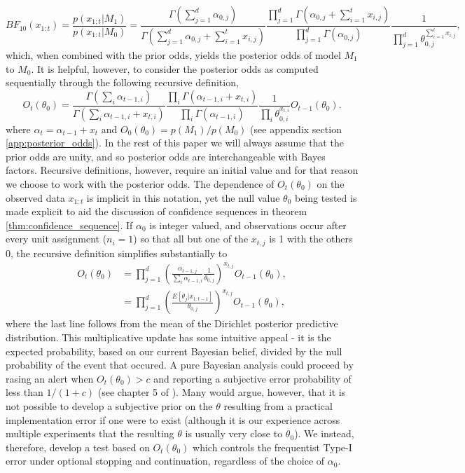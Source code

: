 \documentclass[11pt]{article}
\begin{document}
\begin{equation}
  \label{eq:bayes_factor}
 BF_{10}(x_{1:t}) = \frac{p(x_{1:t}|M_1)}{p(x_{1:t}|M_0)} = \frac{\Gamma(\sum_{j=1}^{d} \alpha_{0,j})}{\Gamma(\sum_{j=1}^{d} \alpha_{0,j} + \sum_{i=1}^{t}x_{i,j})}\frac{\prod_{j=1}^{d}\Gamma(\alpha_{0,j} + \sum_{i=1}^{t}x_{i,j} )}{\prod_{j=1}^{d}\Gamma(\alpha_{0,j} )}\frac{1}{\prod_{j=1}^{d} \theta_{0,j}^{\sum_{i=1}^{t}x_{i,j}}},
\end{equation}
which, when combined with the prior odds, yields the posterior odds of model $M_1$ to $M_0$.
It is helpful, however, to consider the posterior odds as computed sequentially through the following recursive definition,
\begin{equation}
  \label{eq:update_rule}
  O_{t}(\theta_0) = \frac{\Gamma(\sum_i \alpha_{t-1,i})}{\Gamma(\sum_i \alpha_{t-1,i} +  x_{t,i})} \frac{\prod_i \Gamma(\alpha_{t-1,i} + x_{t,i})}{\prod_i \Gamma(\alpha_{t-1,i})} \frac{1}{\prod_i \theta_{0,i}^{x_{t,i}}}  O_{t-1}(\theta_0).
\end{equation}
where $\alpha_t = \alpha_{t-1}+x_t$ and $O_0(\theta_0)=p(M_1)/p(M_0)$ (see appendix section \ref{app:posterior_odds}).
In the rest of this paper we will always assume that the prior odds are unity, and so posterior odds are interchangeable with Bayes factors.
Recursive definitions, however, require an initial value and for that reason we choose to work with the posterior odds.
The dependence of $O_t(\theta_0)$ on the observed data $x_{1:t}$ is implicit in this notation, yet the null value $\theta_0$ being tested is made explicit to aid the discussion of confidence sequences in theorem \ref{thm:confidence_sequence}.
If $\alpha_0$ is integer valued, and observations occur after every unit assignment ($n_i=1$) so that all but one of the $x_{t,j}$ is 1 with the others 0, the recursive definition simplifies substantially to
\begin{align}
  \label{eq:simplified_bayes_factor}
  O_{t}(\theta_0) &= \prod_{j=1}^{d} \left(\frac{\alpha_{t-1,j}}{\sum_i \alpha_{t-1,i}} \frac{1}{\theta_{0,j}}\right)^{x_{t,j}} O_{t-1}(\theta_0),\\
  &=\prod_{j=1}^{d}\left(\frac{E[\theta_j|x_{1:t-1}]}{\theta_{0,j}} \right)^{x_{t,j}} O_{t-1}(\theta_0),
\end{align}
where the last line follows from the mean of the Dirichlet posterior predictive distribution.
This multiplicative update has some intuitive appeal - it is the expected probability, based on our current Bayesian belief, divided by the null probability of the event that occured.
A pure Bayesian analysis could proceed by rasing an alert when $O_t(\theta_0) > c$ and reporting a subjective error probability of less than $1/(1+c)$ (see chapter 5 of \cite{bernardo}).
Many would argue, however, that it is not possible to develop a subjective prior on the $\theta$ resulting from a practical implementation error if one were to exist (although it is our experience across multiple experiments that the resulting $\theta$ is usually very close to $\theta_0$).
We instead, therefore, develop a test based on $O_t(\theta_0)$ which controls the frequentist Type-I error under optional stopping and continuation, regardless of the choice of $\alpha_0$.
\end{document}
